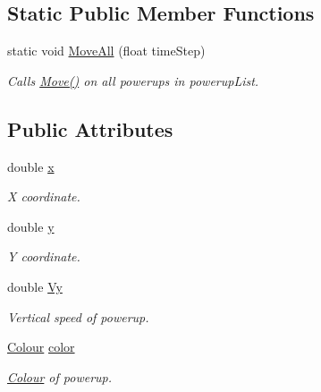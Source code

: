 \subsection*{Static Public Member Functions}
\begin{DoxyCompactItemize}
\item 
static void \hyperlink{class_powerup_a0a9b0365e47a25e5bee5112357d7d1cd}{Move\+All} (float time\+Step)
\begin{DoxyCompactList}\small\item\em Calls \hyperlink{class_powerup_a5e81fffa256f0f339c4ac430d897a1ae}{Move()} on all powerups in powerup\+List. \end{DoxyCompactList}\end{DoxyCompactItemize}
\subsection*{Public Attributes}
\begin{DoxyCompactItemize}
\item 
\mbox{\label{class_powerup_ac021dce376ab3946c8bb9f13add88f9c}} 
double \hyperlink{class_powerup_ac021dce376ab3946c8bb9f13add88f9c}{x}
\begin{DoxyCompactList}\small\item\em X coordinate. \end{DoxyCompactList}\item 
\mbox{\label{class_powerup_af28a919bbed400c8e213d69e25d6a864}} 
double \hyperlink{class_powerup_af28a919bbed400c8e213d69e25d6a864}{y}
\begin{DoxyCompactList}\small\item\em Y coordinate. \end{DoxyCompactList}\item 
\mbox{\label{class_powerup_a219f4a4c1e6d9c0cb6ee60a03c3d9046}} 
double \hyperlink{class_powerup_a219f4a4c1e6d9c0cb6ee60a03c3d9046}{Vy}
\begin{DoxyCompactList}\small\item\em Vertical speed of powerup. \end{DoxyCompactList}\item 
\mbox{\label{class_powerup_a852c3a59988fe5067c5ebef799c50740}} 
\hyperlink{struct_colour}{Colour} \hyperlink{class_powerup_a852c3a59988fe5067c5ebef799c50740}{color}
\begin{DoxyCompactList}\small\item\em \hyperlink{struct_colour}{Colour} of powerup. \end{DoxyCompactList}\end{DoxyCompactItemize}


